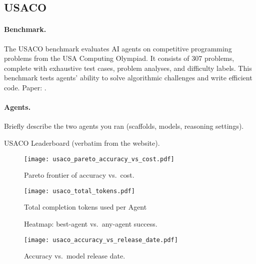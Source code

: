 \subsection{USACO}\label{app:usaco}

\paragraph{Benchmark.}
The USACO benchmark evaluates AI agents on competitive programming problems from the USA Computing Olympiad. It consists of 307 problems, complete with exhaustive test cases, problem analyses, and difficulty labels. This benchmark tests agents' ability to solve algorithmic challenges and write efficient code.
Paper: \cite{usaco}.

\paragraph{Agents.}
Briefly describe the two agents you ran (scaffolds, models, reasoning settings).


\begin{table}[t]
  \centering
  \caption{USACO Leaderboard (verbatim from the website).}
  \label{tab:usaco_full}
  
\end{table}


\begin{figure}[htbp]
  \centering
  \texttt{[image: usaco\_pareto\_accuracy\_vs\_cost.pdf]}
  \caption{Pareto frontier of accuracy vs.\ cost.}
  \label{fig:usaco_pareto}
\end{figure}

\begin{figure}[htbp]
  \centering
  \texttt{[image: usaco\_total\_tokens.pdf]}
  \caption{Total completion tokens used per Agent}
  \label{fig:usaco_tokens}
\end{figure}

\begin{figure*}[t]
  \centering
  \caption{Heatmap: best-agent vs.\ any-agent success.}
  \label{fig:usaco_heatmap}
\end{figure*}

\begin{figure}[htbp]
  \centering
  \texttt{[image: usaco\_accuracy\_vs\_release\_date.pdf]}
  \caption{Accuracy vs.\ model release date.}
  \label{fig:usaco_release}
\end{figure}

\clearpage